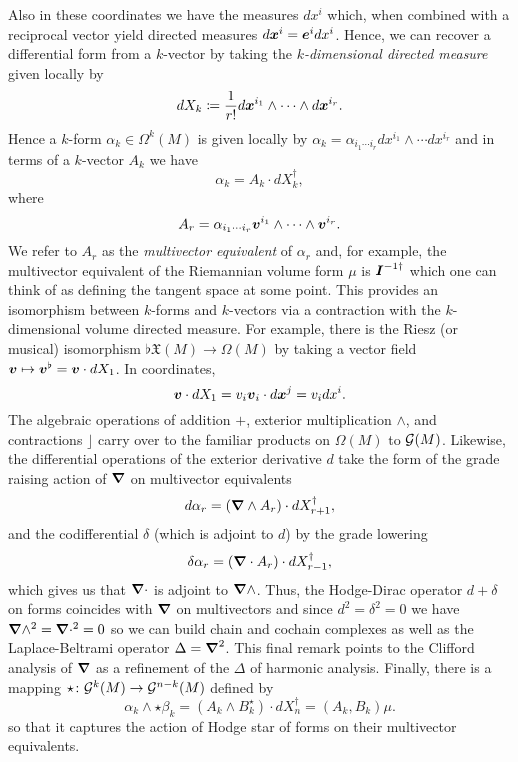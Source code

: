 \documentclass[conf]{new-aiaa}
\begin{document}
Also in these coordinates we have the measures $dx^i$ which, when combined with a reciprocal vector yield directed measures $d\boldsymbol{x}^i = \boldsymbol{e}^i dx^i$. Hence, we can recover a differential form from a $k$-vector by taking the \emph{$k$-dimensional directed measure} given locally by 
\begin{equation}
    dX_k \coloneqq \frac{1}{r!} d\boldsymbol{x}^{i_1}\wedge \cdots \wedge d\boldsymbol{x}^{i_r}.
\end{equation}
Hence a $k$-form $\alpha_k \in \Omega^k(M)$ is given locally by  $\alpha_k = \alpha_{i_1 \cdots i_r} dx^{i_1}\wedge \cdots dx^{i_r}$ and in terms of a $k$-vector $A_k$ we have
\begin{equation}
\alpha_k = A_k \cdot dX_k^\dagger,
\end{equation}
where
\begin{equation}
A_r = \alpha_{i_1 \cdots i_r} \boldsymbol{v}^{i_1} \wedge \cdots \wedge \boldsymbol{v}^{i_r}.
\end{equation}
We refer to $A_r$ as the \emph{multivector equivalent} of $\alpha_r$ and, for example, the multivector equivalent of the Riemannian volume form $\mu$ is $\boldsymbol{I}^{-1 \dagger}$ which one can think of as defining the tangent space at some point. This provides an isomorphism between $k$-forms and $k$-vectors via a contraction with the $k$-dimensional volume directed measure. For example, there is the Riesz (or musical) isomorphism $\flat \mathfrak{X}(M)\to \Omega(M)$ by taking a vector field $\boldsymbol{v} \mapsto \boldsymbol{v}^\flat = \boldsymbol{v} \cdot dX_1$. In coordinates,
\begin{equation}
\label{eq:line_element}
 \boldsymbol{v} \cdot dX_1 = v_i  \boldsymbol{v}_i \cdot d\boldsymbol{x}^j = v_i dx^i.
\end{equation}
The algebraic operations of addition $+$, exterior multiplication $\wedge$, and contractions $\rfloor$ carry over to the familiar products on $\Omega(M)$ to $\mathcal{G}(M)$. Likewise, the differential operations of the exterior derivative $d$ take the form of the grade raising action of $\boldsymbol{\nabla}$ on multivector equivalents
\begin{equation}
d \alpha_r = (\boldsymbol{\nabla} \wedge A_r) \cdot dX_{r+1}^\dagger,
\end{equation}
and the codifferential $\delta$ (which is adjoint to $d$) by the grade lowering
\begin{equation}
\delta \alpha_r = (\boldsymbol{\nabla} \cdot A_r)\cdot dX_{r-1}^\dagger,
\end{equation} 
which gives us that $\boldsymbol{\nabla} \cdot$ is adjoint to $\boldsymbol{\nabla} \wedge$. Thus, the Hodge-Dirac operator $d+\delta$ on forms coincides with $\boldsymbol{\nabla}$ on multivectors and since $d^2=\delta^2=0$ we have $\boldsymbol{\nabla} \wedge^2 = \boldsymbol{\nabla} \cdot^2=0$ so we can build chain and cochain complexes as well as the Laplace-Beltrami operator $\Delta = \boldsymbol{\nabla}^2$. This final remark points to the Clifford analysis of $\boldsymbol{\nabla}$ as a refinement of the $\Delta$ of harmonic analysis. Finally, there is a mapping $\star \colon \mathcal{G}^k(M)\to \mathcal{G}^{n-k}(M)$ defined by
\begin{equation}
\alpha_k \wedge \star \beta_k = (A_k \wedge B_k^{\star})\cdot dX_n^\dagger = (A_k,B_k) \mu.
\end{equation}
so that it captures the action of Hodge star of forms on their multivector equivalents. 
\end{document}
